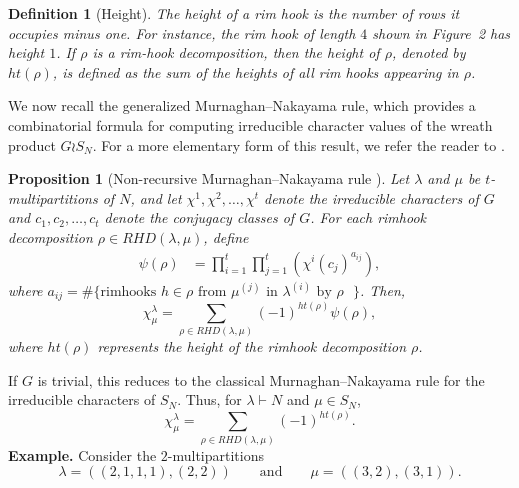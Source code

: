 \documentclass[11pt]{amsart}
\theoremstyle{plain}
\newtheorem{proposition}[theorem]{Proposition}
\newtheorem{definition}{Definition}
\numberwithin{equation}{section}
\begin{document}
	\begin{definition}[Height]
		The \emph{height} of a rim hook is the number of rows it occupies minus one. For instance, the rim hook of length $4$ shown in Figure~2 has height $1$. If $\rho$ is a rim-hook decomposition, then the height of $\rho$, denoted by $ht(\rho)$, is defined as the sum of the heights of all rim hooks appearing in $\rho$.
	\end{definition}
	We now recall the generalized Murnaghan--Nakayama rule, which provides a combinatorial formula for computing irreducible character values of the wreath product $G\wr S_N$. For a more elementary form of this result, we refer the reader to \cite[Proposition~2.8]{dong}.
	\begin{proposition}[Non-recursive Murnaghan--Nakayama rule {\cite[Theorem 4.4.10]{MR644144}}]
		\label{proposition:MNrule}
		Let $\lambda$ and $\mu$ be $t$-multipartitions of $N$, and let $\chi^{1},\chi^{2},\ldots,\chi^{t}$ denote the irreducible characters of $G$ and $c_1, c_2,\dots,c_t$ denote the conjugacy classes of $G$.
		For each rimhook decomposition $\rho \in RHD(\lambda,\mu)$, define
		\begin{align*}
			\psi(\rho)&=\prod_{i=1}^{t}\prod_{j=1}^{t}\left( \chi^{i}(c_j)^{a_{ij}}\right),
		\end{align*}
		where $a_{ij}=\#\{\text{rimhooks $h\in \rho$ from  $\mu^{(j)}$ in $\lambda^{(i)}$ by $\rho$ }\}$.
		\newline
		Then,
		\begin{equation*}
			\chi^\lambda_\mu=\sum_{\rho\in RHD(\lambda,\mu)}(-1)^{ht(\rho)}\psi(\rho),
		\end{equation*}
		where $ht(\rho)$ represents the height of the rimhook decomposition $\rho$.
	\end{proposition}
	If $G$ is trivial, this reduces to the classical Murnaghan--Nakayama rule
	for the irreducible characters of $S_N$. %
	Thus, for $\lambda\vdash N$ and $\mu\in S_N$,
	\begin{equation*}%
		\chi^\lambda_\mu=\sum_{\rho\in RHD(\lambda,\mu)}(-1)^{ht(\rho)}.
	\end{equation*}
	\textbf{Example.}
	Consider the $2$-multipartitions
	\[
	\lambda=((2,1,1,1),(2,2))
	\qquad\text{and}\qquad
	\mu=((3,2),(3,1)).
	\]
\end{document}
